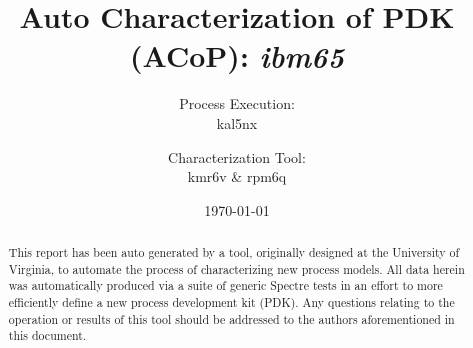 \documentclass[letterpaper]{article}
\title{Auto Characterization of PDK (ACoP): \emph{ibm65}}
\author{Process Execution: \\kal5nx \and Characterization Tool: \\kmr6v \& rpm6q}
\date{\today}
\begin{document}


\maketitle
\begin{abstract}
This report has been auto generated by a tool, originally designed at the University of Virginia, to automate the process of characterizing new process models. All data herein was automatically produced via a suite of generic Spectre tests in an effort to more efficiently define a new process development kit (PDK). Any questions relating to the operation or results of this tool should be addressed to the authors aforementioned in this document.
\end{abstract}

\newpage
\listoffigures 
\newpage
\end{document}
